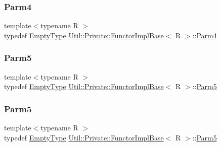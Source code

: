 \mbox{\label{structUtil_1_1Private_1_1FunctorImplBase_a1ad7fe3f243480c44a610927ebe76762}} 
\subsubsection{\texorpdfstring{Parm4}{Parm4}\hspace{0.1cm}{\footnotesize\ttfamily [2/2]}}
{\footnotesize\ttfamily template$<$typename R $>$ \\
typedef \mbox{\hyperlink{classUtil_1_1EmptyType}{Empty\+Type}} \mbox{\hyperlink{structUtil_1_1Private_1_1FunctorImplBase}{Util\+::\+Private\+::\+Functor\+Impl\+Base}}$<$ R $>$\+::\mbox{\hyperlink{structUtil_1_1Private_1_1FunctorImplBase_a1ad7fe3f243480c44a610927ebe76762}{Parm4}}}

\mbox{\label{structUtil_1_1Private_1_1FunctorImplBase_ac5b1d132e854e4f9fd6fb1e43313fa26}} 
\subsubsection{\texorpdfstring{Parm5}{Parm5}\hspace{0.1cm}{\footnotesize\ttfamily [1/2]}}
{\footnotesize\ttfamily template$<$typename R $>$ \\
typedef \mbox{\hyperlink{classUtil_1_1EmptyType}{Empty\+Type}} \mbox{\hyperlink{structUtil_1_1Private_1_1FunctorImplBase}{Util\+::\+Private\+::\+Functor\+Impl\+Base}}$<$ R $>$\+::\mbox{\hyperlink{structUtil_1_1Private_1_1FunctorImplBase_ac5b1d132e854e4f9fd6fb1e43313fa26}{Parm5}}}

\mbox{\label{structUtil_1_1Private_1_1FunctorImplBase_ac5b1d132e854e4f9fd6fb1e43313fa26}} 
\subsubsection{\texorpdfstring{Parm5}{Parm5}\hspace{0.1cm}{\footnotesize\ttfamily [2/2]}}
{\footnotesize\ttfamily template$<$typename R $>$ \\
typedef \mbox{\hyperlink{classUtil_1_1EmptyType}{Empty\+Type}} \mbox{\hyperlink{structUtil_1_1Private_1_1FunctorImplBase}{Util\+::\+Private\+::\+Functor\+Impl\+Base}}$<$ R $>$\+::\mbox{\hyperlink{structUtil_1_1Private_1_1FunctorImplBase_ac5b1d132e854e4f9fd6fb1e43313fa26}{Parm5}}}

